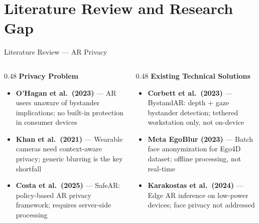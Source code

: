 \documentclass[aspectratio=169]{beamer}
\begin{document}
\section{Literature Review and Research Gap}

\begin{frame}{Literature Review — AR Privacy}
\begin{columns}[T]
\begin{column}{0.48\textwidth}
  \textbf{Privacy Problem}
  \vspace{0.15cm}
  \begin{itemize}\setlength{\itemsep}{0.3cm}
    \item \textbf{O'Hagan et al.\ (2023)} — AR users unaware of bystander implications; no built-in protection in consumer devices
    \item \textbf{Khan et al.\ (2021)} — Wearable cameras need context-aware privacy; generic blurring is the key shortfall
    \item \textbf{Costa et al.\ (2025)} — SafeAR: policy-based AR privacy framework; requires server-side processing
  \end{itemize}
\end{column}
\begin{column}{0.48\textwidth}
  \textbf{Existing Technical Solutions}
  \vspace{0.15cm}
  \begin{itemize}\setlength{\itemsep}{0.3cm}
    \item \textbf{Corbett et al.\ (2023)} — BystandAR: depth + gaze bystander detection; tethered workstation only, not on-device
    \item \textbf{Meta EgoBlur (2023)} — Batch face anonymization for Ego4D dataset; offline processing, not real-time
    \item \textbf{Karakostas et al.\ (2024)} — Edge AR inference on low-power devices; face privacy not addressed
  \end{itemize}
\end{column}
\end{columns}
\end{frame}
\end{document}
